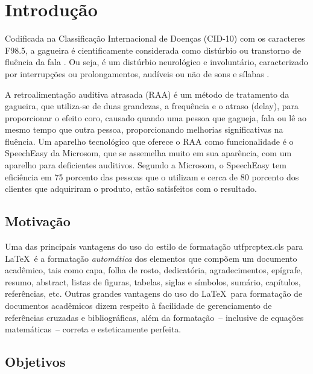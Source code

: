\chapter{Introdu\c{c}\~ao}

Codificada na Classifica\c{c}\~ao Internacional de Doen\c{c}as (CID-10) com os caracteres F98.5, a gagueira \'e cientificamente considerada como dist\'urbio ou transtorno de flu\^encia da fala \cite{Merlo2018}. Ou seja, \'e um dist\'urbio neurol\'ogico e involunt\'ario, caracterizado por interrup\c{c}\~oes ou prolongamentos, aud\'iveis ou n\~ao de sons e s\'ilabas \cite{Buechel2004}.

A retroalimenta\c{c}\~ao auditiva atrasada (RAA) \'e um m\'etodo de tratamento da gagueira, que utiliza-se de duas grandezas, a frequ\^encia e o atraso (delay), para proporcionar o efeito coro, causado quando uma pessoa que gagueja, fala ou l\^e ao mesmo tempo que outra pessoa, proporcionando melhorias significativas na flu\^encia.
Um aparelho tecnol\'ogico que oferece o RAA como funcionalidade \'e o SpeechEasy da Microsom, que se assemelha muito em sua apar\^encia, com um aparelho para deficientes auditivos. Segundo a Microsom, o SpeechEasy tem eficiência em 75 porcento das pessoas que o utilizam e cerca de 80 porcento dos clientes que adquiriram o produto, est\~ao satisfeitos com o resultado.

\section{Motiva\c{c}\~ao}

Uma das principais vantagens do uso do estilo de formata\c{c}\~ao {\ttfamily utfprcptex.cls} para \LaTeX\ \'e a formata\c{c}\~ao \textit{autom\'atica} dos elementos que comp\~oem um documento acad\^emico, tais como capa, folha de rosto, dedicat\'oria, agradecimentos, ep\'igrafe, resumo, abstract, listas de figuras, tabelas, siglas e s\'imbolos, sum\'ario, cap\'itulos, refer\^encias, etc. Outras grandes vantagens do uso do \LaTeX\ para formata\c{c}\~ao de documentos acad\^emicos dizem respeito \`a facilidade de gerenciamento de refer\^encias cruzadas e bibliogr\'aficas, al\'em da formata\c{c}\~ao~-- inclusive de equa\c{c}\~oes  matem\'aticas~-- correta e esteticamente perfeita.

\section{Objetivos}

